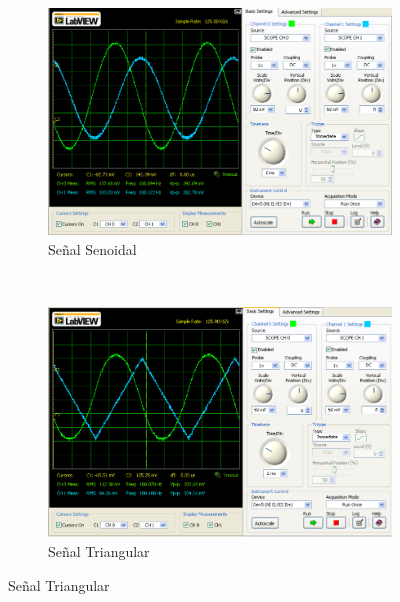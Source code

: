 \documentclass[]{article}
\begin{document}
\begin{figure}[h!]
	
	\centering
	\begin{subfigure}[b]{0.45\textwidth}
		
		\includegraphics[width=\textwidth]{Imagenes/circuito3Senoidal.png}
		\caption{Señal Senoidal}
		\label{fig:circuito3Senoidal}
		
	\end{subfigure}
	~ 
	\begin{subfigure}[b]{0.45\textwidth}
	\includegraphics[width=\textwidth]{Imagenes/circuito3Triangular.png}
	\caption{Señal Triangular}
	\label{fig:circuito3triangular}	
	

\end{subfigure}
\end{figure}
\end{document}
